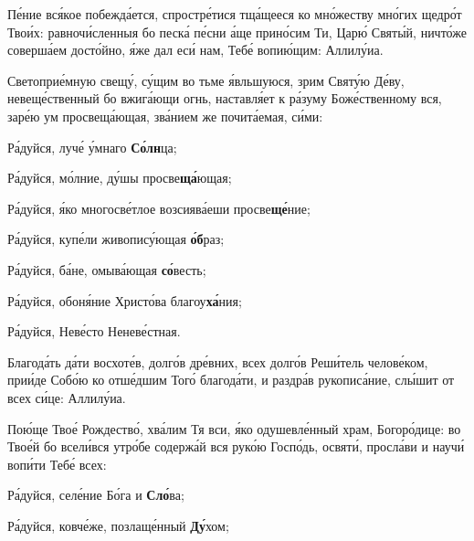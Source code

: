 \begin{russian}


  \Ierei Пе́ние вся́кое побежда́ется, спростре́тися тща́щееся ко мно́жеству мно́гих щедро́т Твои́х: равночи́сленныя бо песка́ пе́сни а́ще прино́сим Ти, Царю́ Святы́й, ничто́же соверша́ем досто́йно, я́же дал еси́ нам, Тебе́ вопию́щим: Аллилу́иа.


  \Ierei Светоприе́мную свещу́, су́щим во тьме я́вльшуюся, зрим Святу́ю Де́ву, невеще́ственный бо вжига́ющи огнь, наставля́ет к ра́зуму Боже́ственному вся, заре́ю ум просвеща́ющая, зва́нием же почита́емая, си́ми:

  Ра́дуйся, луче́ у́мнаго \textbf{Со́лн}ца;


  Ра́дуйся, мо́лние, ду́шы просве\textbf{ща́}ющая;


  Ра́дуйся, я́ко многосве́тлое возсиява́еши просве\textbf{ще́}ние;


  Ра́дуйся, купе́ли живопису́ющая \textbf{о́б}раз;


  Ра́дуйся, ба́не, омыва́ющая \textbf{со́}весть;


  Ра́дуйся, обоня́ние Христо́ва благоу\textbf{ха́}ния;


  Ра́дуйся, Неве́сто Неневе́стная.


  \Ierei Благода́ть да́ти восхоте́в, долго́в дре́вних, всех долго́в Реши́тель челове́ком, прии́де Собо́ю ко отше́дшим Того́ благода́ти, и раздра́в рукописа́ние, слы́шит от всех си́це: Аллилу́иа.


  Пою́ще Твое́ Рождество́, хва́лим Тя вси, я́ко одушевле́нный храм, Богоро́дице: во Твое́й бо всели́вся утро́бе содержа́й вся руко́ю Госпо́дь, освяти́, просла́ви и научи́ вопи́ти Тебе́ всех:

  Ра́дуйся, селе́ние Бо́га и \textbf{Сло́}ва;


  Ра́дуйся, ковче́же, позлаще́нный \textbf{Ду́}хом;


\end{russian}


